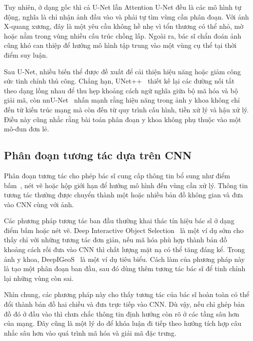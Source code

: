 Tuy nhiên, ở dạng gốc thì cả U-Net lẫn Attention U-Net đều là các mô hình tự động, nghĩa là chỉ nhận ảnh đầu vào và phải tự tìm vùng cần phân đoạn. Với ảnh X-quang xương, đây là một yêu cầu không hề nhẹ vì tổn thương có thể nhỏ, mờ hoặc nằm trong vùng nhiều cấu trúc chồng lấp. Ngoài ra, bác sĩ chẩn đoán ảnh cũng khó can thiệp để hướng mô hình tập trung vào một vùng cụ thể tại thời điểm suy luận.

Sau U-Net, nhiều biến thể được đề xuất để cải thiện hiệu năng hoặc giảm công sức tinh chỉnh thủ công. Chẳng hạn, UNet++~\cite{zhou2018unetplusplus} thiết kế lại các đường nối tắt theo dạng lồng nhau để thu hẹp khoảng cách ngữ nghĩa giữa bộ mã hóa và bộ giải mã, còn nnU-Net~\cite{isensee2021nnunet} nhấn mạnh rằng hiệu năng trong ảnh y khoa không chỉ đến từ kiến trúc mạng mà còn đến từ quy trình cấu hình, tiền xử lý và hậu xử lý. Điều này cũng nhắc rằng bài toán phân đoạn y khoa không phụ thuộc vào một mô-đun đơn lẻ.

\subsection{Phân đoạn tương tác dựa trên CNN}

Phân đoạn tương tác cho phép bác sĩ cung cấp thông tin bổ sung như điểm bấm~\cite{xu2016deepinteractive}, nét vẽ hoặc hộp giới hạn để hướng mô hình đến vùng cần xử lý. Thông tin tương tác thường được chuyển thành một hoặc nhiều bản đồ không gian và đưa vào CNN cùng với ảnh.

Các phương pháp tương tác ban đầu thường khai thác tín hiệu bác sĩ ở dạng điểm bấm hoặc nét vẽ. Deep Interactive Object Selection~\cite{xu2016deepinteractive} là một ví dụ sớm cho thấy chỉ với những tương tác đơn giản, nếu mã hóa phù hợp thành bản đồ khoảng cách rồi đưa vào CNN thì chất lượng mặt nạ có thể tăng đáng kể. Trong ảnh y khoa, DeepIGeoS~\cite{wang2019deepigeos} là một ví dụ tiêu biểu. Cách làm của phương pháp này là tạo một phân đoạn ban đầu, sau đó dùng thêm tương tác bác sĩ để tinh chỉnh lại những vùng còn sai.

Nhìn chung, các phương pháp này cho thấy tương tác của bác sĩ hoàn toàn có thể đổi thành bản đồ hai chiều và đưa trực tiếp vào CNN. Dù vậy, nếu chỉ ghép bản đồ đó ở đầu vào thì chưa chắc thông tin định hướng còn rõ ở các tầng sâu hơn của mạng. Đây cũng là một lý do để khóa luận đi tiếp theo hướng tích hợp câu nhắc sâu hơn vào quá trình mã hóa và giải mã đặc trưng.

